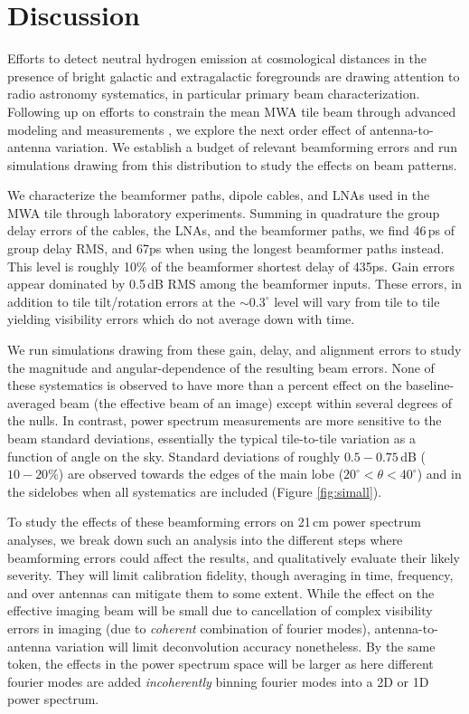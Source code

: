\section{Discussion}

Efforts to detect neutral hydrogen emission at cosmological distances in the presence of bright galactic and extragalactic foregrounds are drawing attention to radio astronomy systematics, in particular primary beam characterization. Following up on efforts to constrain the mean MWA tile beam through advanced modeling  \citep{sutinjo15} and measurements \citep{neben15}, we explore the next order effect of antenna-to-antenna variation. We establish a budget of relevant beamforming errors and run simulations drawing from this distribution to study the effects on beam patterns. 

We characterize the beamformer paths, dipole cables, and LNAs used in the MWA tile through laboratory experiments. Summing in quadrature the group delay errors of the cables, the LNAs, and the beamformer paths, we find 46\,ps of group delay RMS, and 67ps when using the longest beamformer paths instead. This level is roughly 10\% of the beamformer shortest delay of 435ps. Gain errors appear dominated by 0.5\,dB RMS among the beamformer inputs. These errors, in addition to tile tilt/rotation errors at the $\sim0.3^\circ$ level will vary from tile to tile yielding visibility errors which do not average down with time.

We run simulations drawing from these gain, delay, and alignment errors to study the magnitude and angular-dependence of the resulting beam errors. None of these systematics is observed to have more than a percent effect on the baseline-averaged beam (the effective beam of an image) except within several degrees of the nulls. In contrast, power spectrum measurements are more sensitive to the beam standard deviations, essentially the typical tile-to-tile variation as a function of angle on the sky. Standard deviations of roughly $0.5-0.75$\,dB ($10-20\%$) are observed towards the edges of the main lobe ($20^\circ<\theta<40^\circ$) and in the sidelobes when all systematics are included (Figure \ref{fig:simall}). 

To study the effects of these beamforming errors on 21\,cm power spectrum analyses, we break down such an analysis into the different steps where beamforming errors could affect the results, and qualitatively evaluate their likely severity. They will limit calibration fidelity, though averaging in time, frequency, and over antennas can mitigate them to some extent. While the effect on the effective imaging beam will be small due to cancellation of complex visibility errors in imaging (due to \textit{coherent} combination of fourier modes), antenna-to-antenna variation will limit deconvolution accuracy nonetheless. By the same token, the effects in the power spectrum space will be larger as here different fourier modes are added \textit{incoherently} binning fourier modes into a 2D or 1D power spectrum. 

